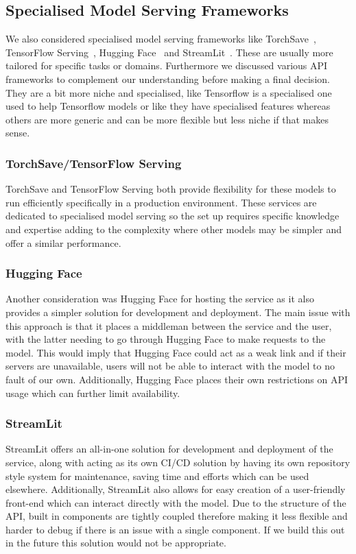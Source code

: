 \documentclass{surreydissertation}
\begin{document}
\subsection{Specialised Model Serving Frameworks}
We also considered specialised model serving frameworks like TorchSave~\cite{TorchSave}, TensorFlow Serving~\cite{tensorflow}, Hugging Face~\cite{huggingface} and StreamLit~\cite{streamlit}. These are usually more tailored for specific tasks or domains. Furthermore we discussed various API frameworks to complement our understanding before making a final decision. 
They are a bit more niche and specialised, like Tensorflow is a specialised one used to help Tensorflow models or like they have specialised features whereas others are more generic and can be more flexible but less niche if that makes sense. 

\subsubsection{TorchSave/TensorFlow Serving}
TorchSave and TensorFlow Serving both provide flexibility for these models to run efficiently specifically in a production environment. These services are dedicated to specialised model serving so the set up requires specific knowledge and expertise adding to the complexity where other models may be simpler and offer a similar performance.

\subsubsection{Hugging Face}
Another consideration was Hugging Face for hosting the service as it also provides a simpler solution for development and deployment. The main issue with this approach is that it places a middleman between the service and the user, with the latter needing to go through Hugging Face to make requests to the model. This would imply that Hugging Face could act as a weak link and if their servers are unavailable, users will not be able to interact with the model to no fault of our own. Additionally, Hugging Face places their own restrictions on API usage which can further limit availability.

\subsubsection{StreamLit}
StreamLit offers an all-in-one solution for development and deployment of the service, along with acting as its own CI/CD solution by having its own repository style system for maintenance, saving time and efforts which can be used elsewhere. Additionally, StreamLit also allows for easy creation of a user-friendly front-end which can interact directly with the model. Due to the structure of the API, built in components are tightly coupled therefore making it less flexible and harder to debug if there is an issue with a single component. If we build this out in the future this solution would not be appropriate.
\end{document}
